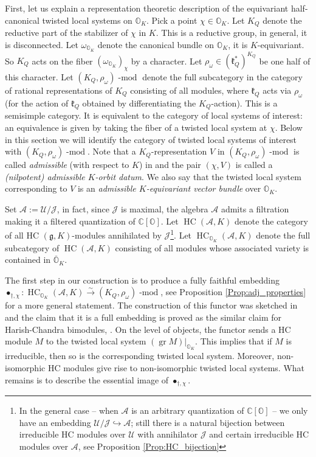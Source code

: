 \documentclass[12pt]{amsart}
\newcommand{\C}{\mathbb{C}}
\newcommand{\A}{\mathcal{A}}
\newcommand{\U}{\mathcal{U}}
\newcommand{\J}{\mathcal{J}}
\newcommand{\g}{\mathfrak{g}}
\newcommand{\Orb}{\mathbb{O}}
\newcommand{\gr}{\operatorname{gr}}
\newcommand{\kf}{\mathfrak{k}}
\newcommand{\HC}{\operatorname{HC}}
\theoremstyle{definition}
\numberwithin{equation}{section}
\begin{document}
First, let us explain a representation theoretic description of the equivariant
half-canonical twisted local systems on $\Orb_K$. Pick a point $\chi\in \Orb_K$.
Let $K_Q$ denote the reductive part of the stabilizer of $\chi$ in $K$. This is a
reductive group, in general, it is disconnected. Let $\omega_{\Orb_K}$ denote the canonical
bundle on $\Orb_K$, it is $K$-equivariant. So $K_Q$ acts on the fiber $(\omega_{\Orb_K})_\chi$
by a character. Let $\rho_{\omega}\in (\kf_Q^*)^{K_Q}$ be one half of this character.
Let $(K_Q,\rho_\omega)\operatorname{-mod}$ denote the full subcategory in the category
of rational representations of $K_Q$ consisting of all modules, where $\kf_Q$ acts via
$\rho_\omega$ (for the action of $\kf_Q$ obtained by differentiating the $K_Q$-action).
This is a semisimple category. It is equivalent to the category of local systems of interest:
an equivalence is given by taking the fiber of a twisted local system at $\chi$. Below in this section
we will identify the category of twisted local systems of interest with $(K_Q,\rho_\omega)\operatorname{-mod}$. Note that a $K_Q$-representation $V$ in $(K_Q,\rho_\omega)\operatorname{-mod}$ is called \emph{admissible} (with respect to $K$) in \cite[Definition 7.13]{Vogan} and the pair $(\chi, V)$ is called a \emph{(nilpotent) admissible $K$-orbit datum}. We also say that the twisted local system corresponding to $V$ is an \emph{admissible $K$-equivariant vector bundle} over $\Orb_K$. 


Set $\A:=\U/\J$, in fact, since $\J$ is maximal, the algebra $\A$ admits a filtration making it a filtered quantization of $\C[\Orb]$. Let $\HC(\A,K)$ denote the category of all HC $(\g,K)$-modules annihilated by $\J$\footnote{In the general case -- when $\A$ is an arbitrary quantization of $\C[\Orb]$ -- we only have an embedding $\U/\J\hookrightarrow \A$; still
there is a natural bijection between irreducible HC modules over $\U$ with annihilator $\J$ and certain irreducible HC modules over $\A$,
see Proposition \ref{Prop:HC_bijection}}. Let $\HC_{\Orb_K}(\A,K)$  denote the full subcategory of $\HC(\A,K)$ consisting of all modules whose associated variety is contained in $\overline{\Orb}_K$.

The first step in our construction is to produce a fully faithful embedding
$\bullet_{\dagger,\chi}: \HC_{\Orb_K}(\A,K)\xrightarrow{\sim} (K_Q,\rho_\omega)\operatorname{-mod}$, see
Proposition \ref{Prop:adj_properties} for a more general statement.
The construction of this functor was sketched in \cite[Section 6.1]{Wdim}
and the claim that it is a full embedding is proved as the similar claim for
Harish-Chandra bimodules, \cite[Theorem 1.3.1]{HC}. On the level of objects, the functor sends a HC module
$M$ to the twisted local system $(\gr M)|_{\Orb_K}$. This implies that if $M$ is irreducible,
then so is the corresponding twisted local system. Moreover, non-isomorphic HC modules
give rise to non-isomorphic twisted local systems. What remains is to describe
the essential image of $\bullet_{\dagger,\chi}$.
\end{document}
